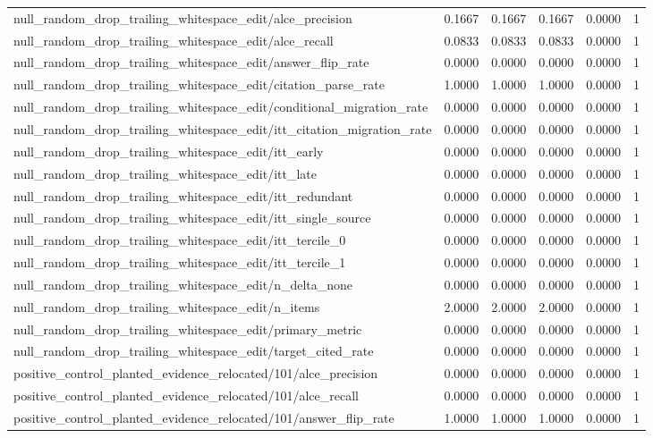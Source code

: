 \begin{table}[h]
\begin{tabular}{lrrrrr}
null_random_drop_trailing_whitespace_edit/alce_precision & 0.1667 & 0.1667 & 0.1667 & 0.0000 & 1 \\
null_random_drop_trailing_whitespace_edit/alce_recall & 0.0833 & 0.0833 & 0.0833 & 0.0000 & 1 \\
null_random_drop_trailing_whitespace_edit/answer_flip_rate & 0.0000 & 0.0000 & 0.0000 & 0.0000 & 1 \\
null_random_drop_trailing_whitespace_edit/citation_parse_rate & 1.0000 & 1.0000 & 1.0000 & 0.0000 & 1 \\
null_random_drop_trailing_whitespace_edit/conditional_migration_rate & 0.0000 & 0.0000 & 0.0000 & 0.0000 & 1 \\
null_random_drop_trailing_whitespace_edit/itt_citation_migration_rate & 0.0000 & 0.0000 & 0.0000 & 0.0000 & 1 \\
null_random_drop_trailing_whitespace_edit/itt_early & 0.0000 & 0.0000 & 0.0000 & 0.0000 & 1 \\
null_random_drop_trailing_whitespace_edit/itt_late & 0.0000 & 0.0000 & 0.0000 & 0.0000 & 1 \\
null_random_drop_trailing_whitespace_edit/itt_redundant & 0.0000 & 0.0000 & 0.0000 & 0.0000 & 1 \\
null_random_drop_trailing_whitespace_edit/itt_single_source & 0.0000 & 0.0000 & 0.0000 & 0.0000 & 1 \\
null_random_drop_trailing_whitespace_edit/itt_tercile_0 & 0.0000 & 0.0000 & 0.0000 & 0.0000 & 1 \\
null_random_drop_trailing_whitespace_edit/itt_tercile_1 & 0.0000 & 0.0000 & 0.0000 & 0.0000 & 1 \\
null_random_drop_trailing_whitespace_edit/n_delta_none & 0.0000 & 0.0000 & 0.0000 & 0.0000 & 1 \\
null_random_drop_trailing_whitespace_edit/n_items & 2.0000 & 2.0000 & 2.0000 & 0.0000 & 1 \\
null_random_drop_trailing_whitespace_edit/primary_metric & 0.0000 & 0.0000 & 0.0000 & 0.0000 & 1 \\
null_random_drop_trailing_whitespace_edit/target_cited_rate & 0.0000 & 0.0000 & 0.0000 & 0.0000 & 1 \\
positive_control_planted_evidence_relocated/101/alce_precision & 0.0000 & 0.0000 & 0.0000 & 0.0000 & 1 \\
positive_control_planted_evidence_relocated/101/alce_recall & 0.0000 & 0.0000 & 0.0000 & 0.0000 & 1 \\
positive_control_planted_evidence_relocated/101/answer_flip_rate & 1.0000 & 1.0000 & 1.0000 & 0.0000 & 1 \\

\end{tabular}
\end{table}
